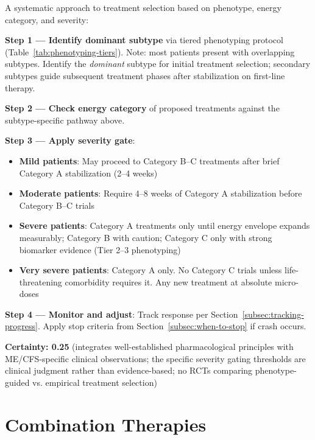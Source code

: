 \begin{directive}
\label{dir:phenotype-treatment-prioritization}

A systematic approach to treatment selection based on phenotype, energy category, and severity:

\textbf{Step 1 --- Identify dominant subtype} via tiered phenotyping protocol (Table~\ref{tab:phenotyping-tiers}). Note: most patients present with overlapping subtypes. Identify the \textit{dominant} subtype for initial treatment selection; secondary subtypes guide subsequent treatment phases after stabilization on first-line therapy.

\textbf{Step 2 --- Check energy category} of proposed treatments against the subtype-specific pathway above.

\textbf{Step 3 --- Apply severity gate}:
\begin{itemize}
    \item \textbf{Mild patients}: May proceed to Category B--C treatments after brief Category A stabilization (2--4 weeks)
    \item \textbf{Moderate patients}: Require 4--8 weeks of Category A stabilization before Category B--C trials
    \item \textbf{Severe patients}: Category A treatments only until energy envelope expands measurably; Category B with caution; Category C only with strong biomarker evidence (Tier 2--3 phenotyping)
    \item \textbf{Very severe patients}: Category A only. No Category C trials unless life-threatening comorbidity requires it. Any new treatment at absolute micro-doses
\end{itemize}

\textbf{Step 4 --- Monitor and adjust}: Track response per Section~\ref{subsec:tracking-progress}. Apply stop criteria from Section~\ref{subsec:when-to-stop} if crash occurs.

\textbf{Certainty: 0.25} (integrates well-established pharmacological principles with ME/CFS-specific clinical observations; the specific severity gating thresholds are clinical judgment rather than evidence-based; no RCTs comparing phenotype-guided vs. empirical treatment selection)
\end{directive}

\section{Combination Therapies}
\label{sec:combination-therapies}

